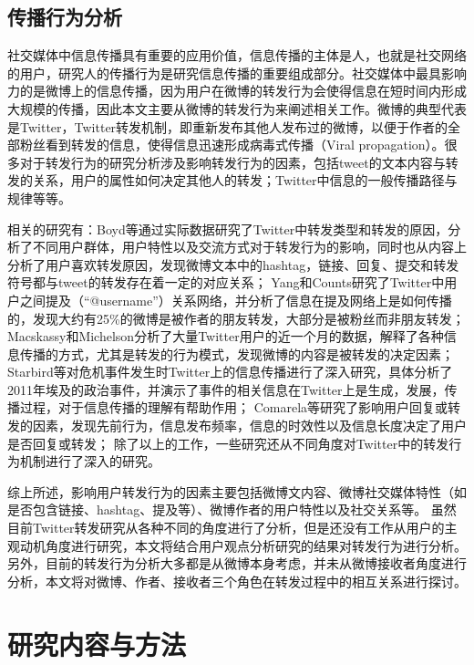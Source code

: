 \subsection{传播行为分析}
\label{rel3}
社交媒体中信息传播具有重要的应用价值，信息传播的主体是人，也就是社交网络的用户，研究人的传播行为是研究信息传播的重要组成部分。社交媒体中最具影响力的是微博上的信息传播，因为用户在微博的转发行为会使得信息在短时间内形成大规模的传播，因此本文主要从微博的转发行为来阐述相关工作。微博的典型代表是Twitter，Twitter转发机制，即重新发布其他人发布过的微博，以便于作者的全部粉丝看到转发的信息，使得信息迅速形成病毒式传播（Viral propagation）。很多对于转发行为的研究分析涉及影响转发行为的因素，包括tweet的文本内容与转发的关系，用户的属性如何决定其他人的转发；Twitter中信息的一般传播路径与规律等等。

相关的研究有：Boyd等通过实际数据研究了Twitter中转发类型和转发的原因，分析了不同用户群体，用户特性以及交流方式对于转发行为的影响，同时也从内容上分析了用户喜欢转发原因，发现微博文本中的hashtag，链接、回复、提交和转发符号都与tweet的转发存在着一定的对应关系；
Yang和Counts研究了Twitter中用户之间提及（“@username”）关系网络，并分析了信息在提及网络上是如何传播的，发现大约有25\%的微博是被作者的朋友转发，大部分是被粉丝而非朋友转发；
Macskassy和Michelson分析了大量Twitter用户的近一个月的数据，解释了各种信息传播的方式，尤其是转发的行为模式，发现微博的内容是被转发的决定因素；
Starbird等对危机事件发生时Twitter上的信息传播进行了深入研究，具体分析了2011年埃及的政治事件，并演示了事件的相关信息在Twitter上是生成，发展，传播过程，对于信息传播的理解有帮助作用；
Comarela等研究了影响用户回复或转发的因素，发现先前行为，信息发布频率，信息的时效性以及信息长度决定了用户是否回复或转发；
除了以上的工作，一些研究还从不同角度对Twitter中的转发行为机制进行了深入的研究。

综上所述，影响用户转发行为的因素主要包括微博文内容、微博社交媒体特性（如是否包含链接、hashtag、提及等）、微博作者的用户特性以及社交关系等。
虽然目前Twitter转发研究从各种不同的角度进行了分析，但是还没有工作从用户的主观动机角度进行研究，本文将结合用户观点分析研究的结果对转发行为进行分析。另外，目前的转发行为分析大多都是从微博本身考虑，并未从微博接收者角度进行分析，本文将对微博、作者、接收者三个角色在转发过程中的相互关系进行探讨。

\section{研究内容与方法}

